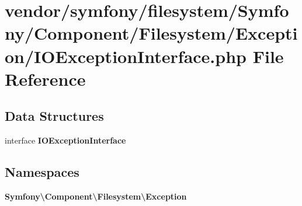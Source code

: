 \section{vendor/symfony/filesystem/\+Symfony/\+Component/\+Filesystem/\+Exception/\+I\+O\+Exception\+Interface.php File Reference}
\label{_i_o_exception_interface_8php}
\subsection*{Data Structures}
\begin{DoxyCompactItemize}
\item 
interface {\bf I\+O\+Exception\+Interface}
\end{DoxyCompactItemize}
\subsection*{Namespaces}
\begin{DoxyCompactItemize}
\item 
 {\bf Symfony\textbackslash{}\+Component\textbackslash{}\+Filesystem\textbackslash{}\+Exception}
\end{DoxyCompactItemize}
